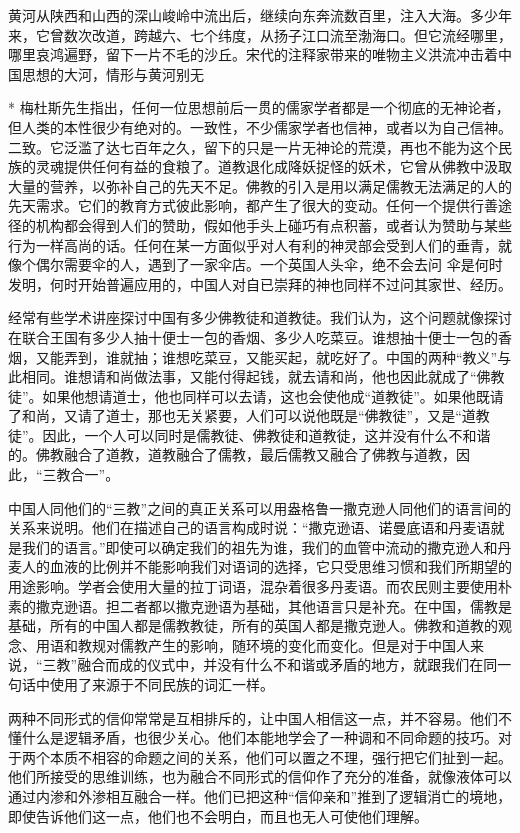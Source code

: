 \documentclass[12pt,oneside]{book}
\begin{document}
\begin{common-format}
黄河从陕西和山西的深山峻岭中流出后，继续向东奔流数百里，注入大海。多少年来，它曾数次改道，跨越六、七个纬度，从扬子江口流至渤海口。但它流经哪里，哪里哀鸿遍野，留下一片不毛的沙丘。宋代的注释家带来的唯物主义洪流冲击着中国思想的大河，情形与黄河别无 

* 梅杜斯先生指出，任何一位思想前后一贯的儒家学者都是一个彻底的无神论者，但人类的本性很少有绝对的。一致性，不少儒家学者也信神，或者以为自己信神。二致。它泛滥了达七百年之久，留下的只是一片无神论的荒漠，再也不能为这个民族的灵魂提供任何有益的食粮了。道教退化成降妖捉怪的妖术，它曾从佛教中汲取大量的营养，以弥补自己的先天不足。佛教的引入是用以满足儒教无法满足的人的先天需求。它们的教育方式彼此影响，都产生了很大的变动。任何一个提供行善途径的机构都会得到人们的赞助，假如他手头上碰巧有点积蓄，或者认为赞助与某些行为一样高尚的话。任何在某一方面似乎对人有利的神灵部会受到人们的垂青，就像个偶尔需要伞的人，遇到了一家伞店。一个英国人头伞，绝不会去问 伞是何时发明，何时开始普遍应用的，中国人对自已崇拜的神也同样不过问其家世、经历。 

经常有些学术讲座探讨中国有多少佛教徒和道教徒。我们认为，这个问题就像探讨在联合王国有多少人抽十便士一包的香烟、多少人吃菜豆。谁想抽十便士一包的香烟，又能弄到，谁就抽；谁想吃菜豆，又能买起，就吃好了。中国的两种“教义”与此相同。谁想请和尚做法事，又能付得起钱，就去请和尚，他也因此就成了“佛教徒”。如果他想请道士，他也同样可以去请，这也会使他成“道教徒”。如果他既请了和尚，又请了道士，那也无关紧要，人们可以说他既是“佛教徒”，又是“道教徒”。因此，一个人可以同时是儒教徒、佛教徒和道教徒，这并没有什么不和谐的。佛教融合了道教，道教融合了儒教，最后儒教又融合了佛教与道教，因此，“三教合一”。 

中国人同他们的“三教”之间的真正关系可以用盎格鲁一撒克逊人同他们的语言间的关系来说明。他们在描述自己的语言构成时说：“撒克逊语、诺曼底语和丹麦语就是我们的语言。”即使可以确定我们的祖先为谁，我们的血管中流动的撒克逊人和丹麦人的血液的比例并不能影响我们对语词的选择，它只受思维习惯和我们所期望的用途影响。学者会使用大量的拉丁词语，混杂着很多丹麦语。而农民则主要使用朴素的撒克逊语。担二者都以撒克逊语为基础，其他语言只是补充。在中国，儒教是基础，所有的中国人都是儒教教徒，所有的英国人都是撒克逊人。佛教和道教的观念、用语和教规对儒教产生的影响，随环境的变化而变化。但是对于中国人来说，“三教”融合而成的仪式中，并没有什么不和谐或矛盾的地方，就跟我们在同一句话中使用了来源于不同民族的词汇一样。 

两种不同形式的信仰常常是互相排斥的，让中国人相信这一点，并不容易。他们不懂什么是逻辑矛盾，也很少关心。他们本能地学会了一种调和不同命题的技巧。对于两个本质不相容的命题之间的关系，他们可以置之不理，强行把它们扯到一起。他们所接受的思维训练，也为融合不同形式的信仰作了充分的准备，就像液体可以通过内渗和外渗相互融合一样。他们已把这种“信仰亲和”推到了逻辑消亡的境地，即使告诉他们这一点，他们也不会明白，而且也无人可使他们理解。 


\end{common-format}
\end{document}
